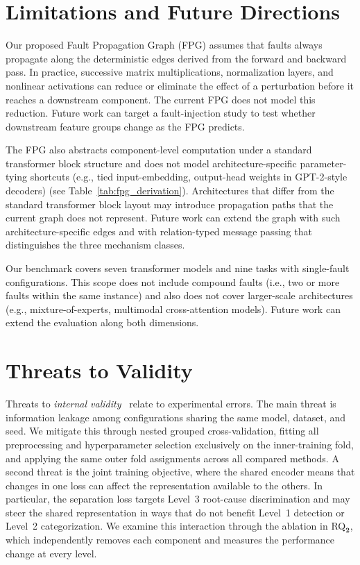 \section{Limitations and Future Directions}
\label{sec:defaultpp_limitations}

Our proposed Fault Propagation Graph (FPG) assumes that faults always propagate along the deterministic edges derived from the forward and backward pass. In practice, successive matrix multiplications, normalization layers, and nonlinear activations can reduce or eliminate the effect of a perturbation before it reaches a downstream component. The current FPG does not model this reduction. Future work can target a fault-injection study to test whether downstream feature groups change as the FPG predicts. 

The FPG also abstracts component-level computation under a standard transformer block structure and does not model architecture-specific parameter-tying shortcuts (e.g., tied input-embedding, output-head weights in GPT-2-style decoders) (see Table~\ref{tab:fpg_derivation}). Architectures that differ from the standard transformer block layout may introduce propagation paths that the current graph does not represent. Future work can extend the graph with such architecture-specific edges and with relation-typed message passing that distinguishes the three mechanism classes. 

Our benchmark covers seven transformer models and nine tasks with single-fault configurations. This scope does not include compound faults (i.e., two or more faults within the same instance) and also does not cover larger-scale architectures (e.g., mixture-of-experts, multimodal cross-attention models). Future work can extend the evaluation along both dimensions. 


\section{Threats to Validity}
\label{sec:defaultpp_threats}

Threats to \emph{internal validity}~\cite{wohlin2012experimentation} relate to experimental errors. The main threat is information leakage among configurations sharing the same model, dataset, and seed. We mitigate this through nested grouped cross-validation, fitting all preprocessing and hyperparameter selection exclusively on the inner-training fold, and applying the same outer fold assignments across all compared methods. A second threat is the joint training objective, where the shared encoder means that changes in one loss can affect the representation available to the others. In particular, the separation loss targets Level~3 root-cause discrimination and may steer the shared representation in ways that do not benefit Level~1 detection or Level~2 categorization. We examine this interaction through the ablation in RQ$\mathbf{_2}$, which independently removes each component and measures the performance change at every level.

